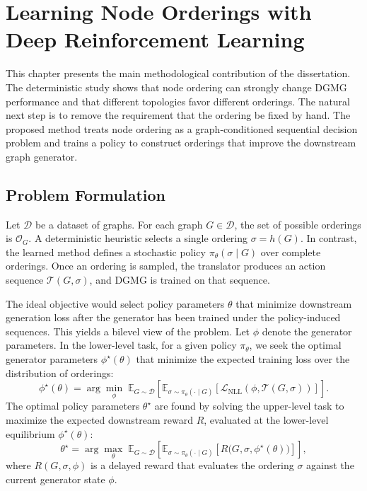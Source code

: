 \chapter{Learning Node Orderings with Deep Reinforcement Learning}
\label{chap:rl-ordering}

This chapter presents the main methodological contribution of the dissertation. The deterministic study shows that node ordering can strongly change DGMG performance and that different topologies favor different orderings. The natural next step is to remove the requirement that the ordering be fixed by hand. The proposed method treats node ordering as a graph-conditioned sequential decision problem and trains a policy to construct orderings that improve the downstream graph generator.

\section{Problem Formulation}
\label{sec:rl-problem-formulation}

Let $\mathcal{D}$ be a dataset of graphs. For each graph $G\in\mathcal{D}$, the set of possible orderings is $\mathcal{O}_G$. A deterministic heuristic selects a single ordering $\sigma=h(G)$. In contrast, the learned method defines a stochastic policy $\pi_\theta(\sigma\mid G)$ over complete orderings. Once an ordering is sampled, the translator produces an action sequence $\mathcal{T}(G,\sigma)$, and DGMG is trained on that sequence.

The ideal objective would select policy parameters $\theta$ that minimize downstream generation loss after the generator has been trained under the policy-induced sequences. This yields a bilevel view of the problem. Let $\phi$ denote the generator parameters. In the lower-level task, for a given policy $\pi_\theta$, we seek the optimal generator parameters $\phi^\star(\theta)$ that minimize the expected training loss over the distribution of orderings:
\begin{equation}
    \phi^\star(\theta) = \arg\min_{\phi} \;\mathbb{E}_{G\sim\mathcal{D}}\left[\mathbb{E}_{\sigma\sim\pi_\theta(\cdot\mid G)}\left[\mathcal{L}_{\mathrm{NLL}}\!\left(\phi,\mathcal{T}(G,\sigma)\right)\right]\right].
    \label{eq:bilevel-phi}
\end{equation}
The optimal policy parameters $\theta^\star$ are found by solving the upper-level task to maximize the expected downstream reward $R$, evaluated at the lower-level equilibrium $\phi^\star(\theta)$:
\begin{equation}
    \theta^\star = \arg\max_{\theta} \;\mathbb{E}_{G\sim\mathcal{D}}\left[\mathbb{E}_{\sigma\sim\pi_\theta(\cdot\mid G)}\left[R\bigl(G,\sigma,\phi^\star(\theta)\bigr)\right]\right],
    \label{eq:bilevel-theta}
\end{equation}
where $R(G,\sigma,\phi)$ is a delayed reward that evaluates the ordering $\sigma$ against the current generator state $\phi$.

